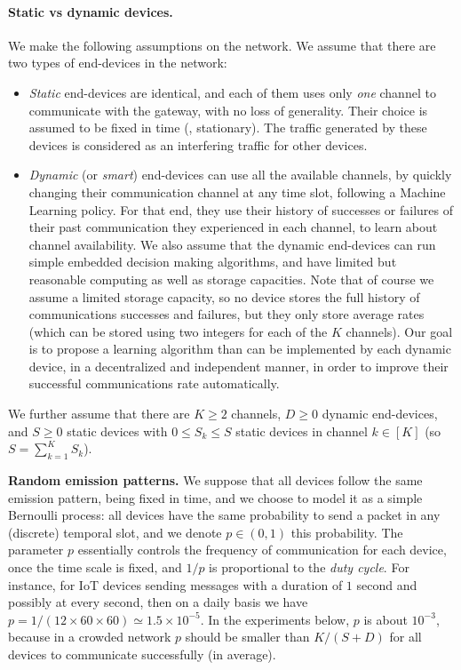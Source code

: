 \paragraph{Static vs dynamic devices.}
%
We make the following assumptions on the network.
We assume that there are two types of end-devices in the network:
\begin{itemize}
    \item
    \emph{Static} end-devices are identical, and each of them uses only \emph{one} channel to communicate with the gateway, with no loss of generality.
    Their choice is assumed to be fixed in time (\ie, stationary). The traffic generated by these devices is considered as an interfering traffic for other devices.
    \item
    \emph{Dynamic} (or \emph{smart}) end-devices can use all the available channels, by quickly changing their communication channel at any time slot, following a Machine Learning policy.
    For that end, they use their history of successes or failures of their past communication they experienced in each channel, to learn about channel availability.
    We also assume that the dynamic end-devices can run simple embedded decision making algorithms, and have limited but reasonable computing as well as storage capacities.
    Note that of course we assume a limited storage capacity, so no device stores the full history of communications successes and failures, but they only store average rates (which can be stored using two integers for each of the $K$ channels).
    Our goal is to propose a learning algorithm than can be implemented by each dynamic device, in a decentralized and independent manner, in order to improve their successful communications rate automatically.
\end{itemize}

We further assume that there are $K \geq 2$ channels, $D \geq 0$ dynamic end-devices, and $S \geq 0$ static devices
with $0 \leq S_k \leq S$ static devices in channel $k \in [K]$ (so $S = \sum_{k=1}^{K} S_k$).


\textbf{Random emission patterns.}
%
We suppose that all devices follow the same emission pattern, being fixed in time, and we choose to model it as a simple Bernoulli process:
all devices have the same probability to send a packet in any (discrete) temporal slot, and we denote $p \in (0, 1)$ this probability.
The parameter $p$ essentially controls the frequency of communication for each device, once the time scale is fixed, and $1/p$ is proportional to the \emph{duty cycle}.
For instance, for IoT devices sending messages with a duration of $1$ second and possibly at every second, then on a daily basis we have $p = 1 / (12 \times 60 \times 60) \simeq 1.5 \times 10^{-5}$.
In the experiments below, $p$ is about $10^{-3}$, because in a crowded network $p$ should be smaller than $K / (S + D)$ for all devices to communicate successfully (in average).


